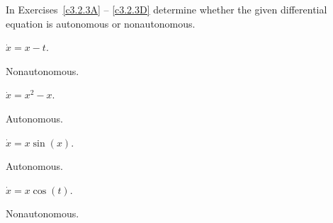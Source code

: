 \documentclass{ximera}
\begin{document}
\noindent In Exercises~\ref{c3.2.3A} -- \ref{c3.2.3D} determine whether the 
given differential equation is autonomous or nonautonomous.
\begin{exercise} \label{c3.2.3A}
$\dot{x}=x-t$.

\begin{solution}
Nonautonomous.

\end{solution}
\end{exercise}
\begin{exercise} \label{c3.2.3B}
$\dot{x}=x^2-x$.

\begin{solution}
Autonomous.

\end{solution}
\end{exercise}
\begin{exercise} \label{c3.2.3C}
$\dot{x}=x\sin(x)$.

\begin{solution}
Autonomous.

\end{solution}
\end{exercise}
\begin{exercise} \label{c3.2.3D}
$\dot{x}=x\cos(t)$.

\begin{solution}
Nonautonomous.



\end{solution}
\end{exercise}
\end{document}
